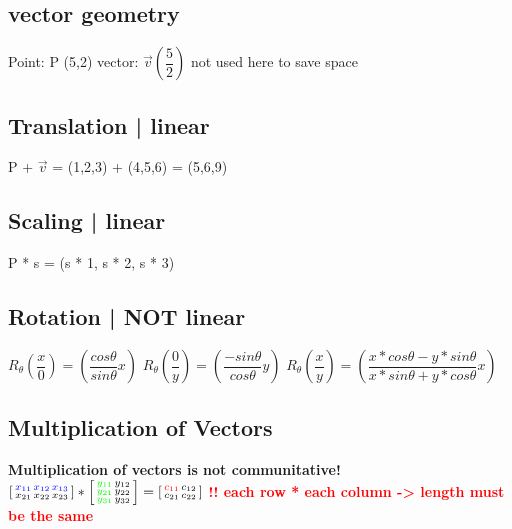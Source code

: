 \documentclass[main.tex,fontsize=12pt,paper=a4,paper=landscape,DIV=calc,]{scrartcl}
\begin{document}
\begin{multicols*}{4}

\section{vector geometry}
Point: P (5,2)\newline
vector: \(\vec{v} \left(\dfrac{5}{2}\right)\) \footnotesize not used here to save space
\normalsize

\subsection{Translation | linear}
P + \(\vec{v} \) = (1,2,3) + (4,5,6) = (5,6,9) 

\subsection{Scaling | linear}
P * s = (s * 1, s * 2, s * 3)

\subsection{Rotation | NOT linear}
\(R_\theta \left(\dfrac{x}{0}\right) = \left(\dfrac{cos \theta}{sin \theta} x\right)\)\newline
\(R_\theta \left(\dfrac{0}{y}\right) = \left(\dfrac{-sin \theta}{cos \theta} y\right)\)\newline
\(R_\theta \left(\dfrac{x}{y}\right) = \left(\dfrac{x * cos \theta - y * sin \theta}{x * sin \theta + y * cos \theta} x\right)\)

\subsection{Multiplication of Vectors}
\textbf{Multiplication of vectors is not communitative!}\newline
\(\left[\begin{smallmatrix}\textcolor{blue}{x_{11} \, x_{12} \, x_{13}} \\ x_{21} \, x_{22} \, x_{23} \end{smallmatrix}\right] *
\left[\begin{smallmatrix} \textcolor{green}{y_{11}} \, y_{12} \\ \textcolor{green}{y_{21}} \, y_{22} \\ 
\textcolor{green}{y_{31}} \, y_{32}\end{smallmatrix}\right] =
\left[\begin{smallmatrix} \textcolor{red}{c_{11}} \, c_{12} \\ c_{21} \, c_{22} \end{smallmatrix}\right]\)\newline
\textbf{\textcolor{red}{!! each row * each column -> length must be the same}}\newline


\end{multicols*}
\end{document}
